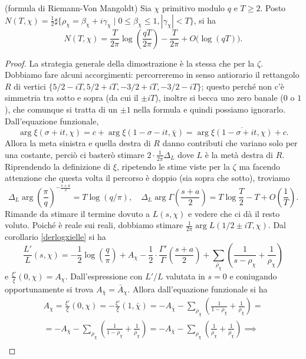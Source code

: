 \begin{prop}
  (formula di Riemann-Von Mangoldt) Sia $\chi$ primitivo modulo $q$ e $T \ge 2$. Posto $N(T,\chi)=\frac{1}{2}\sharp\{\rho_\chi=\beta_\chi+i\gamma_\chi \mid 0 \le \beta_\chi \le 1, |\gamma_\chi|<T\}$, si ha
  $$N(T,\chi)=\frac{T}{2\pi}\log\left(\frac{qT}{2\pi}\right)-\frac{T}{2\pi}+O\big(\log(qT)\big).$$
\end{prop}

\begin{proof}
  La strategia generale della dimostrazione è la stessa che per la $\zeta$. Dobbiamo fare alcuni accorgimenti: percorreremo in senso antiorario il rettangolo $R$ di vertici $\{5/2-iT,5/2+iT, -3/2+iT, -3/2-iT\}$; questo perché non c'è simmetria tra sotto e sopra (da cui il $\pm iT$), inoltre si becca uno zero banale ($0$ o $1$), che comunque si tratta di un $\pm 1$ nella formula e quindi possiamo ignorarlo. Dall'equazione funzionale,
  $$\arg\xi(\sigma+it,\chi)=c+\arg\xi(1-\sigma-it,\bar{\chi})=\arg\overline{\xi(1-\sigma+it,\chi)}+c.$$
  Allora la meta sinistra e quella destra di $R$ danno contributi che variano solo per una costante, perciò ci basterò stimare $2\cdot\frac{1}{2\pi}\Delta_L$ dove $L$ è la metà destra di $R$. Riprendendo la definizione di $\xi$, ripetendo le stime viste per la $\zeta$ ma facendo attenzione che questa volta il percorso è doppio (sia sopra che sotto), troviamo
  $$\Delta_L \arg\left(\frac{\pi}{q}\right)^{-\frac{s+a}{2}}=T\log(q/\pi), \quad \Delta_L\arg\Gamma\left(\frac{s+a}{2}\right)=T\log\frac{T}{2}-T+O\left(\frac{1}{T}\right).$$
  Rimande da stimare il termine dovuto a $L(s,\chi)$ e vedere che ci dà il resto voluto. Poiché è reale sui reali, dobbiamo stimare $\frac{1}{2\pi}\arg L(1/2\pm iT,\chi)$. Dal corollario \ref{derlogxielle} si ha
  $$\frac{L'}{L}(s,\chi)=-\frac{1}{2}\log\left(\frac{q}{\pi}\right)+A_\chi-\frac{1}{2}\cdot\frac{\Gamma'}{\Gamma}\left(\frac{s+a}{2}\right)+\sum_{\rho_\chi} \left(\frac{1}{s-\rho_\chi}+\frac{1}{\rho_\chi}\right)$$
  e $\frac{\xi'}{\xi}(0,\chi)=A_\chi$. Dall'espressione con $L'/L$ valutata in $s=0$ e coniugando opportunamente si trova $A_{\bar{\chi}}=\bar{A}_\chi$. Allora dall'equazione funzionale si ha
  \begin{gather*}
    A_\chi=\frac{\xi'}{\xi}(0,\chi)=-\frac{\xi'}{\xi}(1,\bar{\chi})=-A_{\bar{\chi}}-\sum_{\rho_{\bar{\chi}}} \left(\frac{1}{1-\rho_{\bar{\chi}}}+\frac{1}{\rho_{\bar{\chi}}}\right)= \\
    =-A_{\bar{\chi}}-\sum_{\rho_\chi}\left(\frac{1}{1-\bar{\rho}_\chi}+\frac{1}{\bar{\rho}_\chi}\right)=-A_{\bar{\chi}}-\sum_{\rho_\chi}\left(\frac{1}{\rho_\chi}+\frac{1}{\bar{\rho}_\chi}\right) \implies \\

\end{gather*}
\end{proof}
